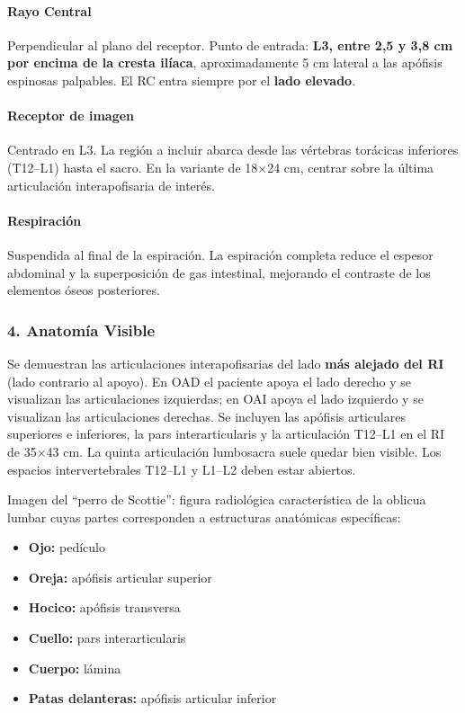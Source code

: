 		\paragraph{Rayo Central}
		Perpendicular al plano del receptor. Punto de entrada: \textbf{L3, entre 2,5 y 3,8 cm por encima de la cresta ilíaca}, aproximadamente 5 cm lateral a las apófisis espinosas palpables. El RC entra siempre por el \textbf{lado elevado}.
		
		\paragraph{Receptor de imagen}
		Centrado en L3. La región a incluir abarca desde las vértebras torácicas inferiores (T12--L1) hasta el sacro. En la variante de 18$\times$24 cm, centrar sobre la última articulación interapofisaria de interés.
		
		\paragraph{Respiración}
		Suspendida al final de la espiración. La espiración completa reduce el espesor abdominal y la superposición de gas intestinal, mejorando el contraste de los elementos óseos posteriores.
		
		\subsubsection*{4. Anatomía Visible}
		
		Se demuestran las articulaciones interapofisarias del lado \textbf{más alejado del RI} (lado contrario al apoyo). En OAD el paciente apoya el lado derecho y se visualizan las articulaciones izquierdas; en OAI apoya el lado izquierdo y se visualizan las articulaciones derechas. Se incluyen las apófisis articulares superiores e inferiores, la pars interarticularis y la articulación T12--L1 en el RI de 35$\times$43 cm. La quinta articulación lumbosacra suele quedar bien visible. Los espacios intervertebrales T12--L1 y L1--L2 deben estar abiertos.
	
		Imagen del ``perro de Scottie'': figura radiológica característica de la oblicua lumbar cuyas partes corresponden a estructuras anatómicas específicas:
		\begin{itemize}
			\item \textbf{Ojo:} pedículo
			\item \textbf{Oreja:} apófisis articular superior
			\item \textbf{Hocico:} apófisis transversa
			\item \textbf{Cuello:} pars interarticularis
			\item \textbf{Cuerpo:} lámina
			\item \textbf{Patas delanteras:} apófisis articular inferior
		\end{itemize}
		
